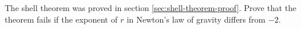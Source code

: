 The shell theorem was proved in section \ref{sec:shell-theorem-proof}.
Prove that the theorem  fails if the exponent of $r$ in Newton's law of gravity differs from $-2$.
